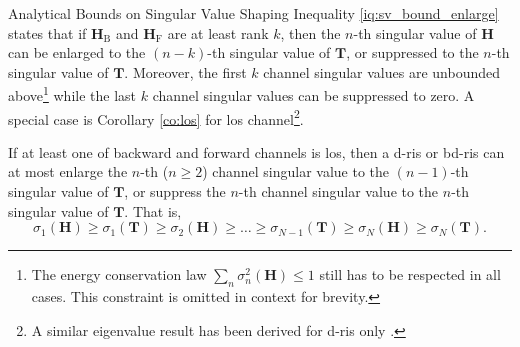 \begin{section}{Analytical Bounds on Singular Value Shaping}
	Inequality \eqref{iq:sv_bound_enlarge} states that
	if $\mathbf{H}_\mathrm{B}$ and $\mathbf{H}_\mathrm{F}$ are at least rank $k$, then
	the $n$-th singular value of $\mathbf{H}$ can be enlarged to the $(n-k)$-th singular value of $\mathbf{T}$, or suppressed to the $n$-th singular value of $\mathbf{T}$.
	Moreover, the first $k$ channel singular values are unbounded above\footnote{The energy conservation law $\sum_n \sigma_n^2(\mathbf{H}) \le 1$ still has to be respected in all cases. This constraint is omitted in context for brevity.} while the last $k$ channel singular values can be suppressed to zero.
	A special case is Corollary \ref{co:los} for \gls{los} channel\footnote{A similar eigenvalue result has been derived for \gls{d}-\gls{ris} only \cite{Semmler2023}.}.





	\begin{corollary}
		If at least one of backward and forward channels is \gls{los}, then a \gls{d}-\gls{ris} or \gls{bd}-\gls{ris} can at most enlarge the $n$-th ($n \ge 2$) channel singular value to the $(n-1)$-th singular value of $\mathbf{T}$, or suppress the $n$-th channel singular value to the $n$-th singular value of $\mathbf{T}$.
		That is,
		\begin{equation}
			\sigma_1(\mathbf{H}) \ge \sigma_1(\mathbf{T}) \ge {\sigma_2(\mathbf{H})} \ge \ldots \ge \sigma_{N-1}(\mathbf{T}) \ge {\sigma_N(\mathbf{H})} \ge \sigma_N(\mathbf{T}).
			\label{iq:sv_bound_los}
		\end{equation}
	\end{corollary}


\end{section}
